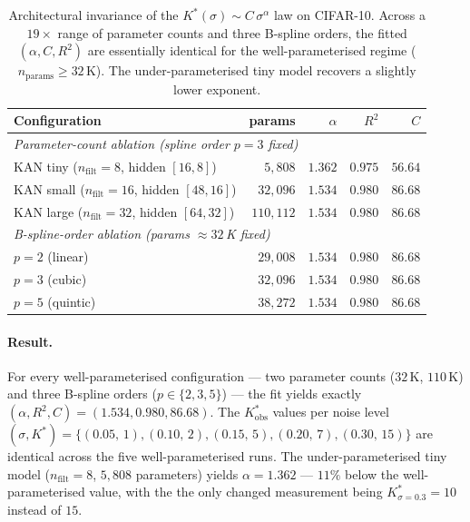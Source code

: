 \documentclass{article}
\begin{document}
\begin{table}[t]
\centering\small
\begin{tabular}{lrrrr}
\toprule
Configuration & params & $\alpha$ & $R^{2}$ & $C$ \\
\midrule
\multicolumn{5}{l}{\emph{Parameter-count ablation (spline order $p{=}3$ fixed)}} \\
KAN tiny  ($n_{\text{filt}}{=}8$, hidden $[16,8]$)    & $5{,}808$   & $1.362$ & $0.975$ & $56.64$ \\
KAN small ($n_{\text{filt}}{=}16$, hidden $[48,16]$)  & $32{,}096$  & $1.534$ & $0.980$ & $86.68$ \\
KAN large ($n_{\text{filt}}{=}32$, hidden $[64,32]$)  & $110{,}112$ & $1.534$ & $0.980$ & $86.68$ \\
\midrule
\multicolumn{5}{l}{\emph{B-spline-order ablation (params $\approx 32$\,K fixed)}} \\
$p{=}2$ (linear)    & $29{,}008$ & $1.534$ & $0.980$ & $86.68$ \\
$p{=}3$ (cubic)     & $32{,}096$ & $1.534$ & $0.980$ & $86.68$ \\
$p{=}5$ (quintic)   & $38{,}272$ & $1.534$ & $0.980$ & $86.68$ \\
\bottomrule
\end{tabular}
\caption{Architectural invariance of the $K^{*}(\sigma){\sim}C\,\sigma^{\alpha}$
law on CIFAR-10. Across a $19\times$ range of parameter counts and three
B-spline orders, the fitted $(\alpha, C, R^{2})$ are essentially identical for
the well-parameterised regime ($n_{\text{params}}{\geq}32$\,K). The
under-parameterised tiny model recovers a slightly lower exponent.}
\label{tab:kstar_invariance}
\end{table}

\paragraph{Result.} For every well-parameterised configuration --- two parameter
counts ($32$\,K, $110$\,K) and three B-spline orders ($p{\in}\{2,3,5\}$) --- the
fit yields exactly $(\alpha, R^{2}, C){=}(1.534, 0.980, 86.68)$. The
$K^{*}_{\text{obs}}$ values per noise level
$(\sigma, K^{*}){=}\{(0.05,\,1), (0.10,\,2), (0.15,\,5), (0.20,\,7),
(0.30,\,15)\}$ are identical across the five well-parameterised runs. The
under-parameterised tiny model ($n_{\text{filt}}{=}8$, $5{,}808$ parameters)
yields $\alpha{=}1.362$ --- $11\%$ below the well-parameterised value, with the
the only changed measurement being $K^{*}_{\sigma=0.3}{=}10$ instead of $15$.
\end{document}
